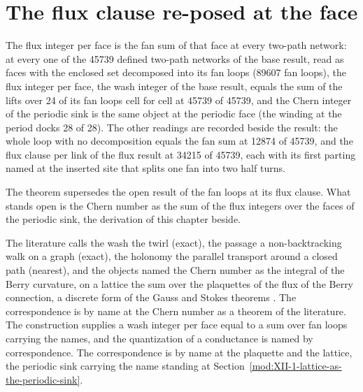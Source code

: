 \section{The flux clause re-posed at the face}\label{mod:XII-4-D538575-flxf-t1}
\begin{chtheorem}
The flux integer per face is the fan sum of that face at every two-path network: at every one of the 45739 defined two-path networks of the base result, read as faces with the enclosed set decomposed into its fan loops (89607 fan loops), the flux integer per face, the wash integer of the base result, equals the sum of the lifts over 24 of its fan loops cell for cell at 45739 of 45739, and the Chern integer of the periodic sink is the same object at the periodic face (the winding at the period docks 28 of 28). The other readings are recorded beside the result: the whole loop with no decomposition equals the fan sum at 12874 of 45739, and the flux clause per link of the flux result at 34215 of 45739, each with its first parting named at the inserted site that splits one fan into two half turns.
\end{chtheorem}
\chdeps{}{}
The theorem supersedes the open result of the fan loops at its flux clause. What stands open is the Chern number as the sum of the flux integers over the faces of the periodic sink, the derivation of this chapter beside.
\begin{chbridge}
The literature calls the wash the twirl (exact), the passage a non-backtracking walk on a graph (exact), the holonomy the parallel transport around a closed path (nearest), and the objects named the Chern number as the integral of the Berry curvature, on a lattice the sum over the plaquettes of the flux of the Berry connection, a discrete form of the Gauss and Stokes theorems \cite{Thouless1982,Berry1984}. The correspondence is by name at the Chern number as a theorem of the literature. The construction supplies a wash integer per face equal to a sum over fan loops carrying the names, and the quantization of a conductance is named by correspondence. The correspondence is by name at the plaquette and the lattice, the periodic sink carrying the name standing at Section~\ref{mod:XII-1-lattice-as-the-periodic-sink}.
\end{chbridge}
